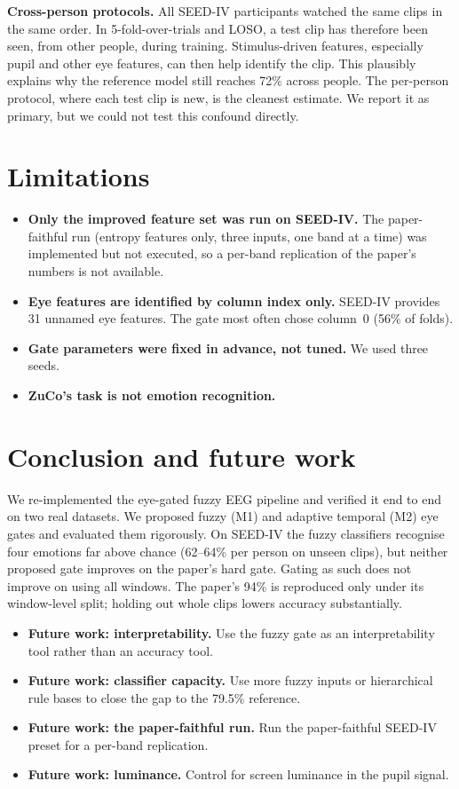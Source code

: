 \documentclass[10pt,a4paper]{article}
\begin{document}
\textbf{Cross-person protocols.} All SEED-IV participants watched the same clips in the same order. In 5-fold-over-trials and LOSO, a test clip has therefore been seen, from other people, during training. Stimulus-driven features, especially pupil and other eye features, can then help identify the clip. This plausibly explains why the reference model still reaches 72\% across people. The per-person protocol, where each test clip is new, is the cleanest estimate. We report it as primary, but we could not test this confound directly.

\section{Limitations}
\begin{itemize}
  \item \textbf{Only the improved feature set was run on SEED-IV.} The paper-faithful run (entropy features only, three inputs, one band at a time) was implemented but not executed, so a per-band replication of the paper's numbers is not available.
  \item \textbf{Eye features are identified by column index only.} SEED-IV provides 31 unnamed eye features. The gate most often chose column~0 (56\% of folds).
  \item \textbf{Gate parameters were fixed in advance, not tuned.} We used three seeds.
  \item \textbf{ZuCo's task is not emotion recognition.}
\end{itemize}

\section{Conclusion and future work}
We re-implemented the eye-gated fuzzy EEG pipeline and verified it end to end on two real datasets. We proposed fuzzy (M1) and adaptive temporal (M2) eye gates and evaluated them rigorously. On SEED-IV the fuzzy classifiers recognise four emotions far above chance (62--64\% per person on unseen clips), but neither proposed gate improves on the paper's hard gate. Gating as such does not improve on using all windows. The paper's 94\% is reproduced only under its window-level split; holding out whole clips lowers accuracy substantially.
\begin{itemize}
  \item \textbf{Future work: interpretability.} Use the fuzzy gate as an interpretability tool rather than an accuracy tool.
  \item \textbf{Future work: classifier capacity.} Use more fuzzy inputs or hierarchical rule bases to close the gap to the 79.5\% reference.
  \item \textbf{Future work: the paper-faithful run.} Run the paper-faithful SEED-IV preset for a per-band replication.
  \item \textbf{Future work: luminance.} Control for screen luminance in the pupil signal.
\end{itemize}
\end{document}
